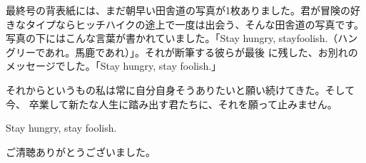 \documentclass[a4paper,11pt,twocolumn]{jarticle}
\begin{document}
最終号の背表紙には、まだ朝早い田舎道の写真が1枚ありました。君が冒険の好
きなタイプならヒッチハイクの途上で一度は出会う、そんな田舎道の写真です。
写真の下にはこんな言葉が書かれていました。「Stay hungry,
stayfoolish.（ハングリーであれ。馬鹿であれ）」。それが断筆する彼らが最後
に残した、お別れのメッセージでした。「Stay hungry, stay foolish.」

それからというもの私は常に自分自身そうありたいと願い続けてきた。そして今、
卒業して新たな人生に踏み出す君たちに、それを願って止みません。

\begin{center}
Stay hungry, stay foolish.
\end{center}

ご清聴ありがとうございました。
\end{document}
